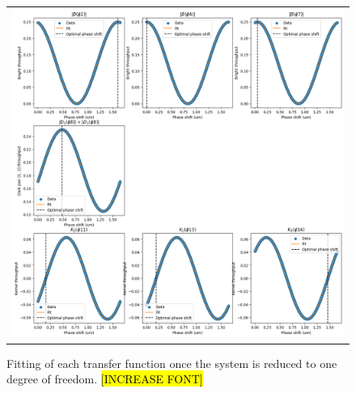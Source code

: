 \documentclass{aa}
\begin{document}
            \begin{figure}
                \begin{center}
                \begin{tabular}{c}
                \includegraphics[width=\linewidth]{img/calibration_obstruction.png}
                \end{tabular}
                \end{center}
                \caption[calibration obstruction] 
                { \label{fig:calibration_obstruction} 
                Fitting of each transfer function once the system is reduced to one degree of freedom. \hl{[INCREASE FONT]}}
            \end{figure}
\end{document}
